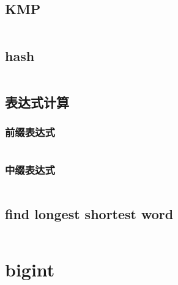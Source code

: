 \documentclass[a4paper,11pt]{article}
\begin{document}
\subsection{KMP}
\inputminted[breaklines]{c++}{string/kmp.cpp}
\subsection{hash}
\inputminted[breaklines]{c++}{string/hash.cpp}
\subsection{表达式计算}
\subsubsection{前缀表达式}
\inputminted[breaklines]{c++}{string/pre_expr.cpp}

\subsubsection{中缀表达式}
\inputminted[breaklines]{c++}{string/post_expr.cpp}
\subsection{find longest shortest word}
\inputminted[breaklines]{c++}{string/find_longest_shortest_word.cpp}

\section{bigint}
\inputminted[breaklines]{c++}{bigint/bigint.cpp}
\end{document}
